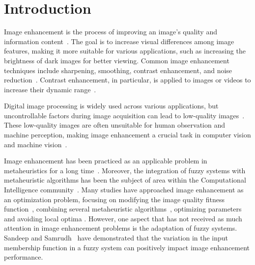 \section{Introduction}
Image enhancement is the process of improving an image's quality and information content~\cite{singh2014various}. The goal is to increase visual differences among image features, making it more suitable for various applications, such as increasing the brightness of dark images for better viewing. Common image enhancement techniques include sharpening, smoothing, contrast enhancement, and noise reduction~\cite{nevriyanto2017image,draa2014artificial,shaked2005sharpness,berkner2001multiscale}. Contrast enhancement, in particular, is applied to images or videos to increase their dynamic range~\cite{hashemi2010image}.

Digital image processing is widely used across various applications, but uncontrollable factors during image acquisition can lead to low-quality images~\cite{WWYG2020}. 
These low-quality images are often unsuitable for human observation and machine perception, making image enhancement a crucial task in computer vision and machine vision~\cite{SZ2013,YSWH2023,JW2022,ITVM2018}.

Image enhancement has been practiced as an applicable problem in metaheuristics for a long time~\cite{cuckoo_search_and_PSO,ACO_GA_SA,munteanu2004gray,mukhopadhyay2023image}. Moreover, the integration of fuzzy systems with metaheuristic algorithms has been the subject of area within the Computational Intelligence 
community~\cite{fuzzy_plus_meta,diaz2017new}. Many studies have approached image enhancement as an optimization problem, focusing on modifying the image quality fitness function~\cite{cuckoo_search_and_PSO,draa2014artificial,oloyede2019new}, combining several metaheuristic algorithms~\cite{cuckoo_search_and_PSO,ACO_GA_SA}, optimizing parameters \cite{samanta2018log} and avoiding local optima \cite{dos2009differential}. However, one aspect that has not received as much attention in image enhancement problems is the adaptation of fuzzy systems. Sandeep and Samrudh~\cite{s2018image} have demonstrated that the variation in the input membership function in a fuzzy system can positively impact image enhancement performance.

